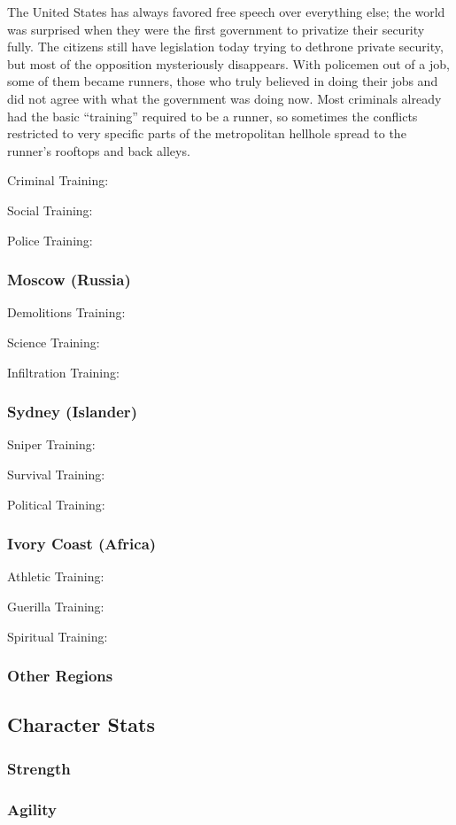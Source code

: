 \documentclass{article}
\begin{document}
\begin{multicols}{2}
The United States has always favored free speech over everything else; the world was surprised when they were the first government to privatize their security fully. The citizens still have legislation today trying to dethrone private security, but most of the opposition mysteriously disappears. With policemen out of a job, some of them became runners, those who truly believed in doing their jobs and did not agree with what the government was doing now. Most criminals already had the basic “training” required to be a runner, so sometimes the conflicts restricted to very specific parts of the metropolitan hellhole spread to the runner’s rooftops and back alleys.

Criminal Training:

Social Training:

Police Training:
\subsubsection{Moscow (Russia)}
Demolitions Training:

Science Training:

Infiltration Training:
\subsubsection{Sydney (Islander)}
Sniper Training:

Survival Training:

Political Training:
\subsubsection{Ivory Coast (Africa)}
Athletic Training:

Guerilla Training:

Spiritual Training:
\subsubsection{Other Regions}
\subsection{Character Stats}
\subsubsection{Strength}
\subsubsection{Agility}

\end{multicols}
\end{document}

